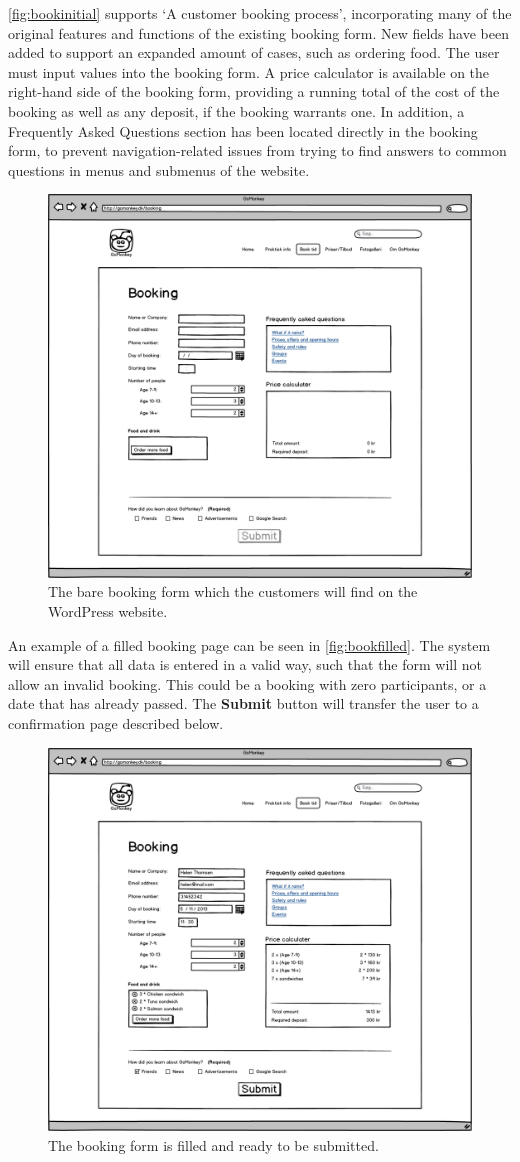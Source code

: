 \autoref{fig:bookinitial} supports `A customer booking process', incorporating
many of the original features and functions of the existing booking form. New
fields have been added to support an expanded amount of cases, such as ordering
food. The user must input values into the booking form. A price calculator is
available on the right-hand side of the booking form, providing a running total
of the cost of the booking as well as any deposit, if the booking warrants one.
In addition, a Frequently Asked Questions section has been located directly in
the booking form, to prevent navigation-related issues from trying to find
answers to common questions in menus and submenus of the website.

\begin{figure}[htbp]
    \centering
        \includegraphics[width=.6\textwidth]{figures/mockup/booking_initial.png}
	    \caption{The bare booking form which the customers will find on the WordPress website.}
        \label{fig:bookinitial}
\end{figure}

An example of a filled booking page can be seen in \autoref{fig:bookfilled}.
The system will ensure that all data is entered in a valid way, such that the
form will not allow an invalid booking. This could be a booking with zero
participants, or a date that has already passed. The \textbf{Submit} button will
transfer the user to a confirmation page described below.

\begin{figure}[htbp]
    \centering
        \includegraphics[width=.6\textwidth]{figures/mockup/booking_filled.png}
	    \caption{The booking form is filled and ready to be submitted.}
        \label{fig:bookfilled}
\end{figure}

